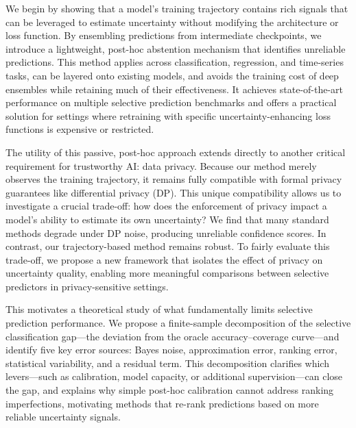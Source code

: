 We begin by showing that a model’s training trajectory contains rich signals that can be leveraged to estimate uncertainty without modifying the architecture or loss function. By ensembling predictions from intermediate checkpoints, we introduce a lightweight, post-hoc abstention mechanism that identifies unreliable predictions. This method applies across classification, regression, and time-series tasks, can be layered onto existing models, and avoids the training cost of deep ensembles while retaining much of their effectiveness. It achieves state-of-the-art performance on multiple selective prediction benchmarks and offers a practical solution for settings where retraining with specific uncertainty-enhancing loss functions is expensive or restricted.


The utility of this passive, post-hoc approach extends directly to another critical requirement for trustworthy AI: data privacy. %
Because our method merely observes the training trajectory, it remains fully compatible with formal privacy guarantees like differential privacy (DP). This unique compatibility allows us to investigate a crucial trade-off: how does the enforcement of privacy impact a model's ability to estimate its own uncertainty? We find that many standard methods degrade under DP noise, producing unreliable confidence scores. In contrast, our trajectory-based method remains robust. To fairly evaluate this trade-off, we propose a new framework that isolates the effect of privacy on uncertainty quality, enabling more meaningful comparisons between selective predictors in privacy-sensitive settings.

This motivates a theoretical study of what fundamentally limits selective prediction performance. We propose a finite-sample decomposition of the selective classification gap—the deviation from the oracle accuracy–coverage curve—and identify five key error sources: Bayes noise, approximation error, ranking error, statistical variability, and a residual term. This decomposition clarifies which levers—such as calibration, model capacity, or additional supervision—can close the gap, and explains why simple post-hoc calibration cannot address ranking imperfections, motivating methods that re-rank predictions based on more reliable uncertainty signals.

